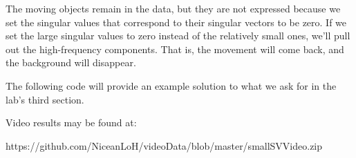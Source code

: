 The moving objects remain in the data, but they are not expressed because we set the singular values that correspond to their singular vectors to be zero. If we set the large singular values to zero instead of the relatively small ones, we'll pull out the high-frequency components. That is, the movement will come back, and the background will disappear.

The following code will provide an example solution to what we ask for in the lab's third section.


Video results may be found at:

https://github.com/NiceanLoH/videoData/blob/master/smallSVVideo.zip
